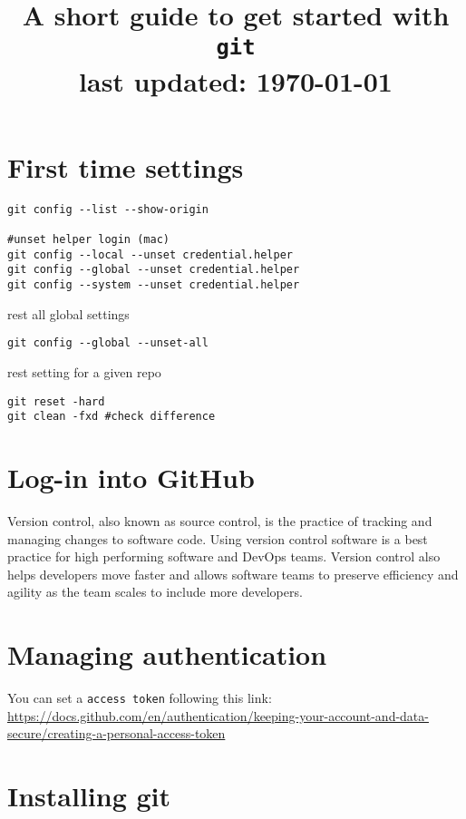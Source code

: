 \documentclass[11pt]{article}
\title{A short guide to get started with \texttt{git} \\[2em] \small{last updated: \today}}
\date{}
\begin{document}
\maketitle

\section*{First time settings}

\begin{lstlisting}
git config --list --show-origin

#unset helper login (mac)
git config --local --unset credential.helper
git config --global --unset credential.helper
git config --system --unset credential.helper
\end{lstlisting}

rest all global settings

\begin{lstlisting}
git config --global --unset-all	
\end{lstlisting}

rest setting for a given repo
\begin{lstlisting}
git reset -hard
git clean -fxd #check difference
\end{lstlisting}


\section*{Log-in into GitHub}

Version control, also known as source control, is the practice of tracking and managing changes to software code. Using version control software is a best practice for high performing software and DevOps teams. Version control also helps developers move faster and allows software teams to preserve efficiency and agility as the team scales to include more developers.

\section*{Managing authentication}

You can set a \texttt{access token} following this link: \url{https://docs.github.com/en/authentication/keeping-your-account-and-data-secure/creating-a-personal-access-token}

\section*{Installing git}
\end{document}
